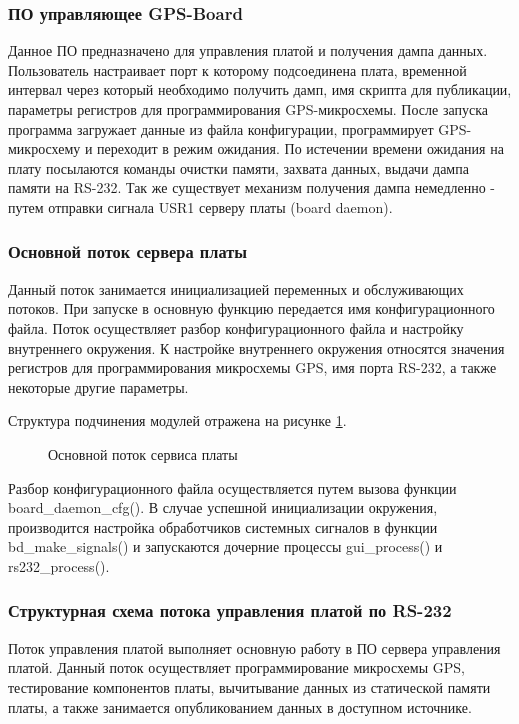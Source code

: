 \subsubsection*{ПО управляющее GPS-Board}
\label{sec:board_daemon}
Данное ПО предназначено для управления платой и получения дампа данных. Пользователь настраивает порт к которому подсоединена плата,
временной интервал через который необходимо получить дамп, имя скрипта для публикации, параметры регистров для программирования
GPS-микросхемы. После запуска программа загружает данные из файла конфигурации, программирует GPS-микросхему и переходит в режим
ожидания. По истечении времени ожидания на плату посылаются команды очистки памяти, захвата данных, выдачи дампа памяти на RS-232.
Так же существует механизм получения дампа немедленно - путем отправки сигнала USR1 серверу платы (board daemon).

\subsubsection*{Основной поток сервера платы}
Данный поток занимается инициализацией переменных и обслуживающих потоков. При запуске в основную функцию передается
имя конфигурационного файла. Поток осуществляет разбор конфигурационного файла и настройку внутреннего окружения.
К настройке внутреннего окружения относятся значения регистров для программирования микросхемы GPS, имя порта RS-232, а
также некоторые другие параметры.

Структура подчинения модулей отражена на рисунке \ref{pic:board_daemon}.

\begin{figure}[h]
\begin{center}
\end{center}
\caption{Основной поток сервиса платы}
\label{pic:board_daemon}
\end{figure}

Разбор конфигурационного файла осуществляется путем вызова функции board\_daemon\_cfg(). В случае успешной инициализации окружения,
производится настройка обработчиков системных сигналов в функции bd\_make\_signals() и запускаются дочерние процессы gui\_process()
и rs232\_process().


\subsubsection*{Структурная схема потока управления платой по RS-232}
Поток управления платой выполняет основную работу в ПО сервера управления платой. Данный поток осуществляет программирование
микросхемы GPS, тестирование компонентов платы, вычитывание данных из статической памяти платы, а также занимается опубликованием
данных в доступном источнике.

